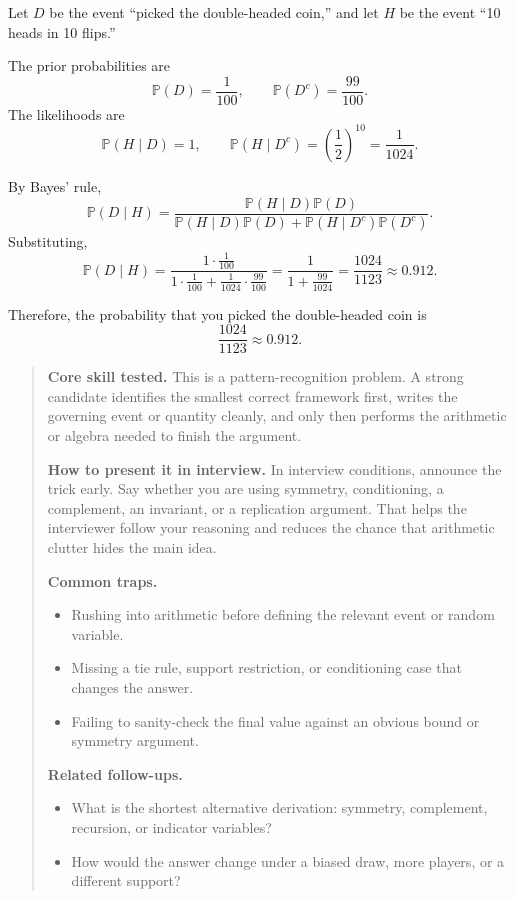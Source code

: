 \documentclass[11pt,letterpaper,openany]{book}
\newenvironment{EditorialNote}
  {\begin{quote}\small\setlength{\parskip}{0.25em}}
  {\end{quote}}
\newcommand{\QuestionSpacer}{\vspace{0.4em}}
\begin{document}
Let \(D\) be the event ``picked the double-headed coin,'' and let \(H\) be the event ``10 heads in 10 flips.''

The prior probabilities are
\[
\mathbb{P}(D)=\frac{1}{100},
\qquad
\mathbb{P}(D^c)=\frac{99}{100}.
\]
The likelihoods are
\[
\mathbb{P}(H\mid D)=1,
\qquad
\mathbb{P}(H\mid D^c)=\left(\frac12\right)^{10}=\frac{1}{1024}.
\]

By Bayes' rule,
\[
\mathbb{P}(D\mid H)
=
\frac{\mathbb{P}(H\mid D)\mathbb{P}(D)}
{\mathbb{P}(H\mid D)\mathbb{P}(D)+\mathbb{P}(H\mid D^c)\mathbb{P}(D^c)}.
\]
Substituting,
\[
\mathbb{P}(D\mid H)
=
\frac{1\cdot \frac{1}{100}}
{1\cdot \frac{1}{100}+\frac{1}{1024}\cdot \frac{99}{100}}
=
\frac{1}{1+\frac{99}{1024}}
=
\frac{1024}{1123}
\approx 0.912.
\]

Therefore, the probability that you picked the double-headed coin is
\[
\boxed{\frac{1024}{1123}\approx 0.912}.
\]

\begin{EditorialNote}


\textbf{Core skill tested.} This is a pattern-recognition problem. A strong candidate identifies the smallest correct framework first, writes the governing event or quantity cleanly, and only then performs the arithmetic or algebra needed to finish the argument.

\textbf{How to present it in interview.} In interview conditions, announce the trick early. Say whether you are using symmetry, conditioning, a complement, an invariant, or a replication argument. That helps the interviewer follow your reasoning and reduces the chance that arithmetic clutter hides the main idea.

\textbf{Common traps.}
\begin{itemize}
\item Rushing into arithmetic before defining the relevant event or random variable.
\item Missing a tie rule, support restriction, or conditioning case that changes the answer.
\item Failing to sanity-check the final value against an obvious bound or symmetry argument.
\end{itemize}

\textbf{Related follow-ups.}
\begin{itemize}
\item What is the shortest alternative derivation: symmetry, complement, recursion, or indicator variables?
\item How would the answer change under a biased draw, more players, or a different support?
\end{itemize}


\end{EditorialNote}
\QuestionSpacer
\end{document}
